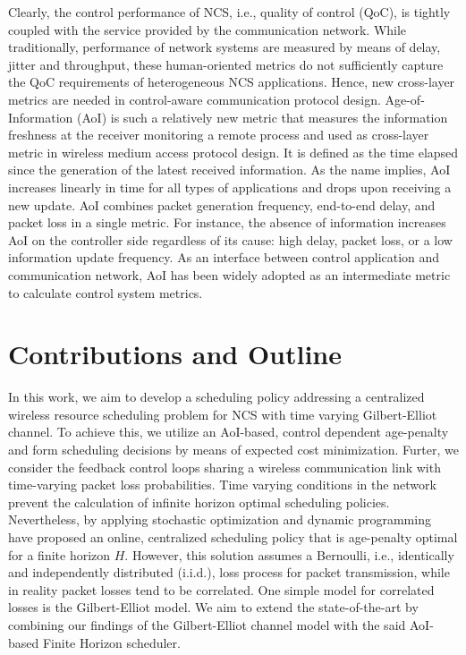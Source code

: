 Clearly, the control performance of NCS, i.e., quality of control (QoC), is
tightly coupled with the service provided by the communication network. While
traditionally, performance of network systems are measured by means of delay,
jitter and throughput, these human-oriented metrics do not sufficiently capture
the QoC requirements of heterogeneous NCS applications. Hence, new cross-layer
metrics are needed in control-aware communication protocol design.
Age-of-Information (AoI) is such a relatively new metric that measures the
information freshness at the receiver monitoring a remote process
\cite{kaul2012real} and used as cross-layer metric in wireless medium access
protocol design. It is defined as the time elapsed since the generation of the
latest received information. As the name implies, AoI increases linearly in time
for all types of applications and drops upon receiving a new update. AoI
combines packet generation frequency, end-to-end delay, and packet loss in a
single metric. For instance, the absence of information increases AoI on the
controller side regardless of its cause: high delay, packet loss, or a low
information update frequency. As an interface between control application and
communication network, AoI has been widely adopted as an intermediate metric to
calculate control system metrics. 


\section*{Contributions and Outline}
In this work, we aim to develop a scheduling policy addressing a centralized
wireless resource scheduling problem for NCS with time varying Gilbert-Elliot
channel. To achieve this, we utilize an AoI-based, control dependent age-penalty
and form scheduling decisions by means of expected cost minimization. Furter, we
consider the feedback control loops sharing a wireless communication link with
time-varying packet loss probabilities. Time varying conditions in the network
prevent the calculation of infinite horizon optimal scheduling policies.
Nevertheless, by applying stochastic optimization and dynamic programming
\cite{ayan2020aoi} have proposed an online, centralized scheduling policy that
is age-penalty optimal for a finite horizon $H$. However, this solution assumes
a Bernoulli, i.e., identically and independently distributed (i.i.d.), loss
process for packet transmission, while in reality packet losses tend to be
correlated. One simple model for correlated losses is the Gilbert-Elliot model.
We aim to extend the state-of-the-art by combining our findings of the
Gilbert-Elliot channel model with the said AoI-based Finite Horizon scheduler.


